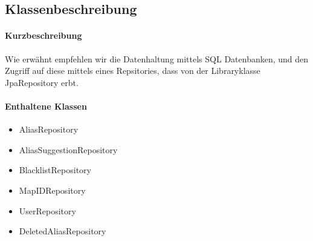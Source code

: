 \subsection*{Klassenbeschreibung}%
\paragraph*{Kurzbeschreibung}
Wie erwähnt empfehlen wir die Datenhaltung mittels SQL Datenbanken, und den Zugriff auf diese mittels eines Repsitories,
dass von der Libraryklasse \dq JpaRepository \dq erbt.

\paragraph*{Enthaltene Klassen}
\begin{itemize}
    \item AliasRepository
    \item AliasSuggestionRepository
    \item BlacklistRepository
    \item MapIDRepository
    \item UserRepository
    \item DeletedAliasRepository
\end{itemize}
